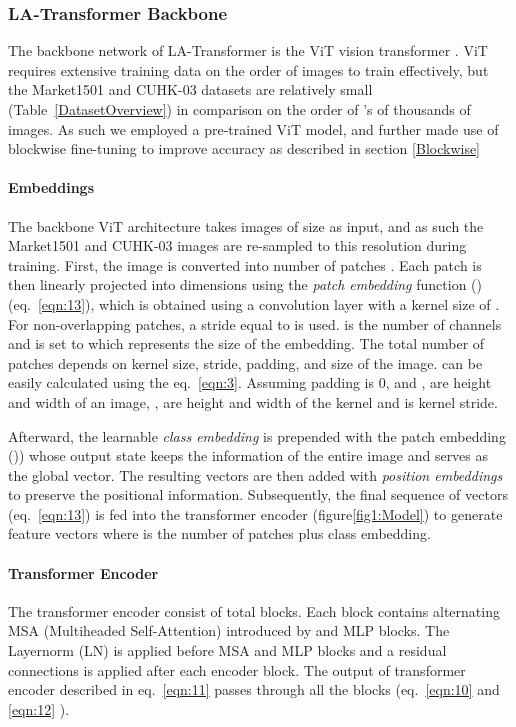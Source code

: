 \documentclass{article}
\begin{document}
\subsubsection{LA-Transformer Backbone} \label{part1}
The backbone network of LA-Transformer is the ViT vision transformer \citep{ViT}.  ViT requires extensive training data on the order of  images to train effectively, but the Market1501 and CUHK-03 datasets are relatively small (Table~\ref{DatasetOverview}) in comparison on the order of 's of thousands of images. As such we employed a pre-trained ViT model, and further made use of blockwise fine-tuning to improve accuracy as described in section \ref{Blockwise}

\paragraph{Embeddings} The backbone ViT architecture takes images of size  as input, and as such the Market1501 and CUHK-03 images are re-sampled to this resolution during training. First, the image is converted into  number of patches . Each patch is then linearly projected into  dimensions using the \textit{patch embedding} function () (eq.~\ref{eqn:13}), which is obtained using a convolution layer with a kernel size of .  For non-overlapping patches, a stride equal to  is used.  is the number of channels and is set to  which represents the size of the embedding. The total number of patches  depends on kernel size, stride, padding, and size of the image.   can be easily calculated using the eq.~\ref{eqn:3}. Assuming padding is 0, and ,  are height and width of an image, ,  are height and width of the kernel and  is kernel stride. 



Afterward, the learnable \textit{class embedding}  is prepended with the patch embedding ()) whose output state keeps the information of the entire image and serves as the global vector. The resulting vectors are then added with \textit{position embeddings}  to preserve the positional information. Subsequently, the final sequence of vectors  (eq.~\ref{eqn:13}) is fed into the transformer encoder (figure\ref{fig1:Model}) to generate  feature vectors where  is the number of patches plus class embedding.



\paragraph{Transformer Encoder}  The transformer encoder consist of total  blocks. Each block contains alternating MSA (Multiheaded Self-Attention) introduced by \citet{Transformer} and MLP blocks. The Layernorm (LN) is applied before MSA and MLP blocks and a residual connections is applied after each encoder block. The output of transformer encoder  described in eq.~\ref{eqn:11} passes through all the  blocks (eq.~\ref{eqn:10} and \ref{eqn:12} ). 
\end{document}
